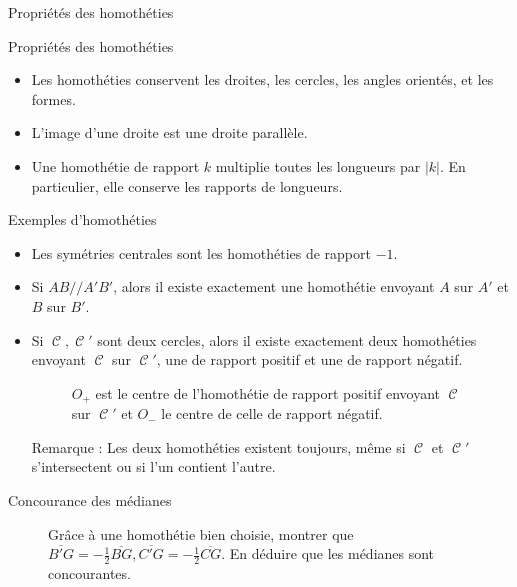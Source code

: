 \documentclass[french]{beamer}
\DeclareMathOperator{\C}{\mathcal C}
\theoremstyle{plain}
\begin{document}
\begin{frame}{Propriétés des homothéties}
  \begin{exampleblock}{Propriétés des homothéties}
    \begin{itemize}
      \item Les homothéties conservent les droites, les cercles, les angles orientés, et les formes.
      \item L’image d’une droite est une droite parallèle.
      \item Une homothétie de rapport $ k $ multiplie toutes les longueurs par $ |k| $. En particulier, elle conserve les rapports de longueurs.
    \end{itemize}
  \end{exampleblock}
\end{frame}


\begin{frame}{Exemples d'homothéties}
  \begin{itemize}
    \item Les symétries centrales sont les homothéties de rapport $ -1 $.
    \item Si $ AB /\!/ A'B' $, alors il existe exactement une homothétie envoyant $ A $ sur $ A'$ et $ B $ sur $ B' $.
    \item Si $ \C, \C' $ sont deux cercles, alors il existe exactement deux homothéties envoyant $ \C $ sur $ \C' $, une de rapport positif et une de rapport négatif.
  \begin{figure}
    \centering
    \caption{$ O_+ $ est le centre de l'homothétie de rapport positif envoyant $ \C $ sur $ \C' $ et $ O_- $ le centre de celle de rapport négatif.}
  \end{figure}
  Remarque : Les deux homothéties existent toujours, même si $ \C $ et $ \C' $ s'intersectent ou si l'un contient l'autre.
  \end{itemize}
\end{frame}


\begin{frame}{Concourance des médianes}
  \begin{figure}
    \centering
    \caption{Grâce à une homothétie bien choisie, montrer que $ \overline{B'G} = -\frac 12\overline{BG}, \overline{C'G} = -\frac 12\overline{CG} $. En déduire que les médianes sont concourantes.}
  \end{figure}
\end{frame}
\end{document}
